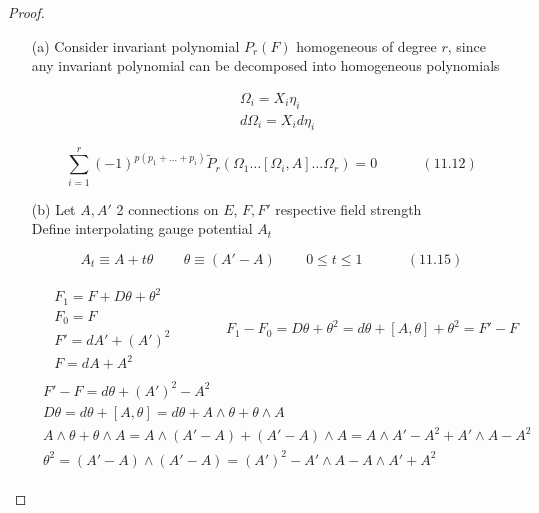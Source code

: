 \documentclass{book}
\begin{document}
\begin{proof}
\begin{enumerate}
\item[(a)] Consider invariant polynomial $P_r(F)$ homogeneous of degree $r$, since any invariant polynomial can be decomposed into homogeneous polynomials 

\[
\begin{aligned}
  & \Omega_i = X_i \eta_i \\ 
  & d\Omega_i = X_i d\eta_i
\end{aligned}
\]

\begin{equation}
  \sum_{i=1}^r (-1)^{ p ( p_1 + \dots + p_i ) } \widetilde{P}_r( \Omega_1 \dots [\Omega_i, A ] \dots \Omega_r ) = 0 \quad \quad \quad \, (11.12)
\end{equation}



\item[(b)] Let $A, A'$ 2 connections on $E$, $F, F'$ respective field strength \\

Define interpolating gauge potential $A_t$ 

\begin{equation}
  A_t \equiv A + t \theta \quad \quad \, \theta \equiv ( A' - A) \quad \quad \, 0 \leq t \leq 1 \quad \quad \quad \, (11.15)
\end{equation}



\[
\begin{gathered}
  \begin{aligned}
    & F_1 = F+ D\theta + \theta^2 \\
    & F_0 = F \\ 
    & F' = dA' + (A')^2 \\ 
    & F = dA + A^2 
\end{aligned}  \quad \quad \quad \, \begin{gathered} F_1 - F_0 = D\theta + \theta^2 = d\theta + [A, \theta] +  \theta^2 = F' - F \end{gathered} \\
\begin{gathered}
  F' - F = d\theta + (A')^2 - A^2 \\ 
D\theta = d\theta + [A, \theta ] = d\theta + A \wedge \theta + \theta \wedge A \\ 
A \wedge \theta +  \theta \wedge A = A \wedge ( A' - A) + (A' - A) \wedge A = A\wedge A' - A^2 + A' \wedge A - A^2 \\
\theta^2 = (A' - A) \wedge (A' - A) = (A')^2 - A' \wedge A - A \wedge A' + A^2
\end{gathered}
\end{gathered}
\]


\end{enumerate}
\end{proof}
\end{document}
